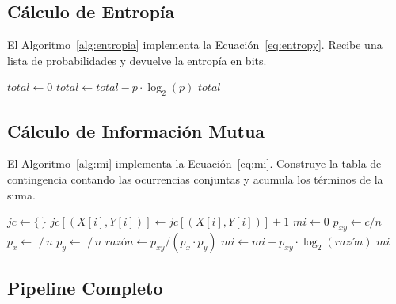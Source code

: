 \documentclass[12pt, a4paper]{article}
\begin{document}
\subsection{Cálculo de Entropía}

El Algoritmo~\ref{alg:entropia} implementa la Ecuación~\ref{eq:entropy}.
Recibe una lista de probabilidades y devuelve la entropía en bits.

\begin{algorithm}[H]
\caption{Cálculo de Entropía $H(X)$}\label{alg:entropia}
\begin{algorithmic}[1]
    \State $total \gets 0$
            \State $total \gets total - p \cdot \log_2(p)$
        \EndIf
    \EndFor
    \State \Return $total$
\EndFunction
\end{algorithmic}
\end{algorithm}

\subsection{Cálculo de Información Mutua}

El Algoritmo~\ref{alg:mi} implementa la Ecuación~\ref{eq:mi}. Construye
la tabla de contingencia contando las ocurrencias conjuntas y acumula
los términos de la suma.

\begin{algorithm}[H]
\caption{Cálculo de Información Mutua $I(X;Y)$}\label{alg:mi}
\begin{algorithmic}[1]
    \State $jc \gets \{\,\}$ 
        \State $jc[(X[i], Y[i])] \gets jc[(X[i], Y[i])] + 1$
    \EndFor
    \State $mi \gets 0$
        \State $p_{xy} \gets c / n$
        \State $p_x \gets$  $/\, n$
        \State $p_y \gets$  $/\, n$
        \State $razón \gets p_{xy} / (p_x \cdot p_y)$
        \State $mi \gets mi + p_{xy} \cdot \log_2(razón)$
    \EndFor
    \State \Return $mi$
\EndFunction
\end{algorithmic}
\end{algorithm}

\subsection{Pipeline Completo}
\end{document}
